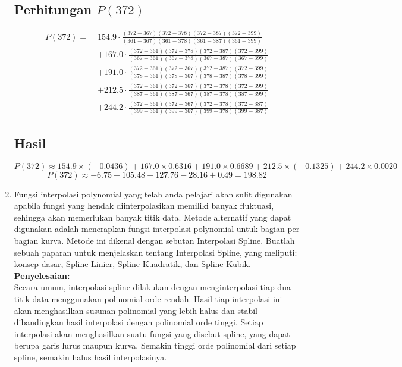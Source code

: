 \documentclass{article}
\newcommand{\penyelesaian}{\textbf{Penyelesaian: }}
\begin{document}
\begin{enumerate}
    \subsection*{Perhitungan \( P(372) \)}


    \begin{align*}
    P(372) = \;& 154.9 \cdot \frac{(372-367)(372-378)(372-387)(372-399)}{(361-367)(361-378)(361-387)(361-399)} \\
    & + 167.0 \cdot \frac{(372-361)(372-378)(372-387)(372-399)}{(367-361)(367-378)(367-387)(367-399)} \\
    & + 191.0 \cdot \frac{(372-361)(372-367)(372-387)(372-399)}{(378-361)(378-367)(378-387)(378-399)} \\
    & + 212.5 \cdot \frac{(372-361)(372-367)(372-378)(372-399)}{(387-361)(387-367)(387-378)(387-399)} \\
    & + 244.2 \cdot \frac{(372-361)(372-367)(372-378)(372-387)}{(399-361)(399-367)(399-378)(399-387)}
    \end{align*}

    \subsection*{Hasil}
    \[
    P(372) \approx 154.9 \times (-0.0436) + 167.0 \times 0.6316 + 191.0 \times 0.6689 + 212.5 \times (-0.1325) + 244.2 \times 0.0020
    \]
    \[
    P(372) \approx -6.75 + 105.48 + 127.76 - 28.16 + 0.49 = \boxed{198.82}
    \]

    \item Fungsi interpolasi polynomial yang telah anda pelajari akan sulit digunakan apabila fungsi yang hendak diinterpolasikan memiliki banyak fluktuasi, sehingga akan memerlukan banyak titik data.
    Metode alternatif yang dapat digunakan adalah menerapkan fungsi interpolasi polynomial untuk bagian per bagian kurva. 
    Metode ini dikenal dengan sebutan Interpolasi Spline. Buatlah sebuah paparan untuk menjelaskan tentang Interpolasi Spline, yang meliputi: konsep dasar, Spline Linier, Spline Kuadratik, dan Spline Kubik. \\
    \penyelesaian \\
    Secara umum, interpolasi spline dilakukan dengan menginterpolasi tiap dua titik data menggunakan polinomial orde rendah. 
    Hasil tiap interpolasi ini akan menghasilkan susunan polinomial yang lebih halus dan stabil dibandingkan hasil interpolasi dengan polinomial orde tinggi.
    Setiap interpolasi akan menghasilkan suatu fungsi yang disebut spline, yang dapat berupa garis lurus maupun kurva. 
    Semakin tinggi orde polinomial dari setiap spline, semakin halus hasil interpolasinya. 


\end{enumerate}
\end{document}
